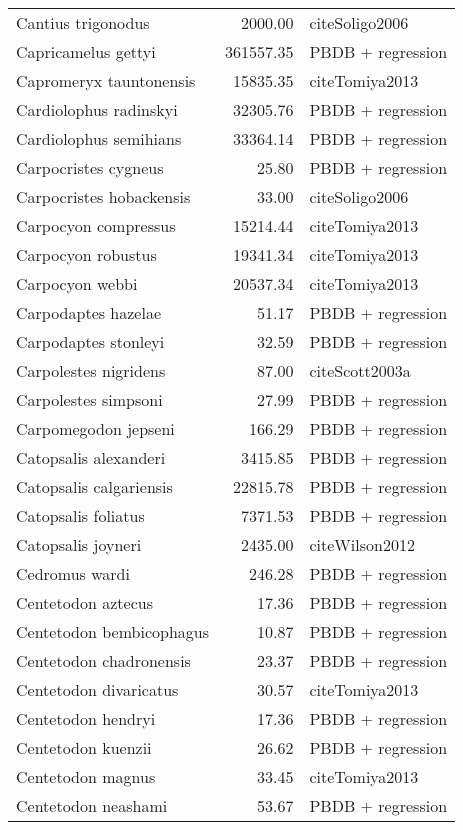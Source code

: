 \begin{table}[ht]
\begin{tabular}{lrl}
  Cantius trigonodus & 2000.00 & cite{Soligo2006} \\ 
  Capricamelus gettyi & 361557.35 & PBDB + regression \\ 
  Capromeryx tauntonensis & 15835.35 & cite{Tomiya2013} \\ 
  Cardiolophus radinskyi & 32305.76 & PBDB + regression \\ 
  Cardiolophus semihians & 33364.14 & PBDB + regression \\ 
  Carpocristes cygneus & 25.80 & PBDB + regression \\ 
  Carpocristes hobackensis & 33.00 & cite{Soligo2006} \\ 
  Carpocyon compressus & 15214.44 & cite{Tomiya2013} \\ 
  Carpocyon robustus & 19341.34 & cite{Tomiya2013} \\ 
  Carpocyon webbi & 20537.34 & cite{Tomiya2013} \\ 
  Carpodaptes hazelae & 51.17 & PBDB + regression \\ 
  Carpodaptes stonleyi & 32.59 & PBDB + regression \\ 
  Carpolestes nigridens & 87.00 & cite{Scott2003a} \\ 
  Carpolestes simpsoni & 27.99 & PBDB + regression \\ 
  Carpomegodon jepseni & 166.29 & PBDB + regression \\ 
  Catopsalis alexanderi & 3415.85 & PBDB + regression \\ 
  Catopsalis calgariensis & 22815.78 & PBDB + regression \\ 
  Catopsalis foliatus & 7371.53 & PBDB + regression \\ 
  Catopsalis joyneri & 2435.00 & cite{Wilson2012} \\ 
  Cedromus wardi & 246.28 & PBDB + regression \\ 
  Centetodon aztecus & 17.36 & PBDB + regression \\ 
  Centetodon bembicophagus & 10.87 & PBDB + regression \\ 
  Centetodon chadronensis & 23.37 & PBDB + regression \\ 
  Centetodon divaricatus & 30.57 & cite{Tomiya2013} \\ 
  Centetodon hendryi & 17.36 & PBDB + regression \\ 
  Centetodon kuenzii & 26.62 & PBDB + regression \\ 
  Centetodon magnus & 33.45 & cite{Tomiya2013} \\ 
  Centetodon neashami & 53.67 & PBDB + regression \\ 

\end{tabular}
\end{table}
